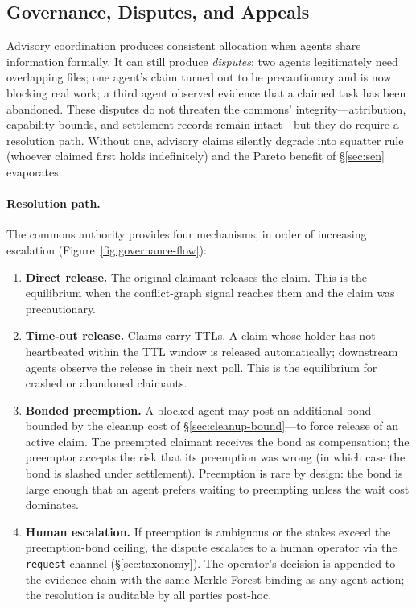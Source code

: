\documentclass[11pt,a4paper]{article}
\theoremstyle{definition}
\theoremstyle{remark}
\begin{document}
\subsection{Governance, Disputes, and Appeals}\label{sec:governance}

Advisory coordination produces consistent allocation when agents share information formally. It can still produce \emph{disputes}: two agents legitimately need overlapping files; one agent's claim turned out to be precautionary and is now blocking real work; a third agent observed evidence that a claimed task has been abandoned. These disputes do not threaten the commons' integrity---attribution, capability bounds, and settlement records remain intact---but they do require a resolution path. Without one, advisory claims silently degrade into squatter rule (whoever claimed first holds indefinitely) and the Pareto benefit of \S\ref{sec:sen} evaporates.

\paragraph{Resolution path.} The commons authority provides four mechanisms, in order of increasing escalation (Figure~\ref{fig:governance-flow}):
\begin{enumerate}[nosep]
  \item \textbf{Direct release.} The original claimant releases the claim. This is the equilibrium when the conflict-graph signal reaches them and the claim was precautionary.
  \item \textbf{Time-out release.} Claims carry TTLs. A claim whose holder has not heartbeated within the TTL window is released automatically; downstream agents observe the release in their next poll. This is the equilibrium for crashed or abandoned claimants.
  \item \textbf{Bonded preemption.} A blocked agent may post an additional bond---bounded by the cleanup cost of \S\ref{sec:cleanup-bound}---to force release of an active claim. The preempted claimant receives the bond as compensation; the preemptor accepts the risk that its preemption was wrong (in which case the bond is slashed under settlement). Preemption is rare by design: the bond is large enough that an agent prefers waiting to preempting unless the wait cost dominates.
  \item \textbf{Human escalation.} If preemption is ambiguous or the stakes exceed the preemption-bond ceiling, the dispute escalates to a human operator via the \texttt{request} channel (\S\ref{sec:taxonomy}). The operator's decision is appended to the evidence chain with the same Merkle-Forest binding as any agent action; the resolution is auditable by all parties post-hoc.
\end{enumerate}
\end{document}
